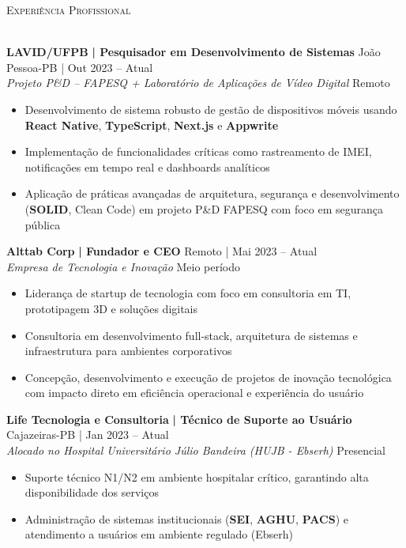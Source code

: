 \documentclass[a4paper]{article}
\newcommand{\lineunder}{
    \vspace*{-8pt} \\
    \hspace*{-18pt} \hrulefill \\
}
\newcommand{\header}[1]{
    {\hspace*{-18pt}\vspace*{6pt} \textsc{#1}}
    \vspace*{-6pt} \lineunder
}
\begin{document}
%
%
\header{Experiência Profissional}
\vspace{2mm}

\textbf{LAVID/UFPB}\textbf{ | Pesquisador em Desenvolvimento de Sistemas} \hfill João Pessoa-PB | Out 2023 -- Atual\\
\textit{Projeto P\&D – FAPESQ + Laboratório de Aplicações de Vídeo Digital} \hfill Remoto\\
\vspace{-3mm}
\begin{itemize} \itemsep -3pt
    \item Desenvolvimento de sistema robusto de gestão de dispositivos móveis usando \textbf{React Native}, \textbf{TypeScript}, \textbf{Next.js} e \textbf{Appwrite}
    \item Implementação de funcionalidades críticas como rastreamento de IMEI, notificações em tempo real e dashboards analíticos
    \item Aplicação de práticas avançadas de arquitetura, segurança e desenvolvimento (\textbf{SOLID}, Clean Code) em projeto P\&D FAPESQ com foco em segurança pública
\end{itemize}

\textbf{Alttab Corp}\textbf{ | Fundador e CEO} \hfill Remoto | Mai 2023 -- Atual\\
\textit{Empresa de Tecnologia e Inovação} \hfill Meio período\\
\vspace{-3mm}
\begin{itemize} \itemsep -3pt
    \item Liderança de startup de tecnologia com foco em consultoria em TI, prototipagem 3D e soluções digitais
    \item Consultoria em desenvolvimento full-stack, arquitetura de sistemas e infraestrutura para ambientes corporativos
    \item Concepção, desenvolvimento e execução de projetos de inovação tecnológica com impacto direto em eficiência operacional e experiência do usuário
\end{itemize}

\textbf{Life Tecnologia e Consultoria}\textbf{ | Técnico de Suporte ao Usuário} \hfill Cajazeiras-PB | Jan 2023 -- Atual\\
\textit{Alocado no Hospital Universitário Júlio Bandeira (HUJB - Ebserh)} \hfill Presencial\\
\vspace{-3mm}
\begin{itemize} \itemsep -3pt
    \item Suporte técnico N1/N2 em ambiente hospitalar crítico, garantindo alta disponibilidade dos serviços
    \item Administração de sistemas institucionais (\textbf{SEI}, \textbf{AGHU}, \textbf{PACS}) e atendimento a usuários em ambiente regulado (Ebserh)
\end{itemize}
\end{document}

